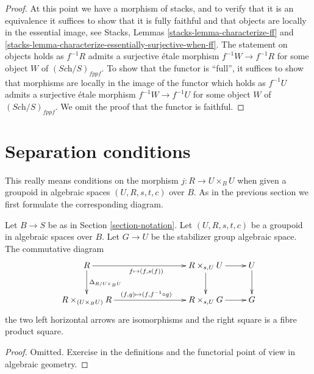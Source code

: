\begin{proof}
\medskip\noindent
At this point we have a morphism of stacks, and to verify that it is an
equivalence it suffices to show that it is fully faithful and that
objects are locally in the essential image, see
Stacks, Lemmas \ref{stacks-lemma-characterize-ff} and
\ref{stacks-lemma-characterize-essentially-surjective-when-ff}.
The statement on objects holds as $f^{-1}R$ admits a surjective \'etale
morphism $f^{-1}W \to f^{-1}R$ for some object $W$ of
$(\textit{Sch}/S)_{fppf}$. To show that the functor is ``full'', it
suffices to show that morphisms are locally in the image
of the functor which holds as $f^{-1}U$ admits a surjective \'etale morphism
$f^{-1}W \to f^{-1}U$ for some object $W$ of $(\textit{Sch}/S)_{fppf}$.
We omit the proof that the functor is faithful.
\end{proof}










\section{Separation conditions}
\label{section-separation}

\noindent
This really means conditions on the morphism $j : R \to U \times_B U$
when given a groupoid in algebraic spaces $(U, R, s, t, c)$ over $B$.
As in the previous section we first formulate the corresponding diagram.

\begin{lemma}
\label{lemma-diagram-diagonal}
Let $B \to S$ be as in Section \ref{section-notation}.
Let $(U, R, s, t, c)$ be a groupoid in algebraic spaces over $B$.
Let $G \to U$ be the stabilizer group algebraic space.
The commutative diagram
$$
\xymatrix{
R \ar[d]^{\Delta_{R/U \times_B U}} \ar[rrr]_{f \mapsto (f, s(f))} & & &
R \times_{s, U} U \ar[d] \ar[r] & U \ar[d] \\
R \times_{(U \times_B U)} R \ar[rrr]^{(f, g) \mapsto (f, f^{-1} \circ g)} & & &
R \times_{s, U} G \ar[r] & G
}
$$
the two left horizontal arrows are isomorphisms
and the right square is a fibre product square.
\end{lemma}

\begin{proof}
Omitted.
Exercise in the definitions and the functorial point of
view in algebraic geometry.
\end{proof}


